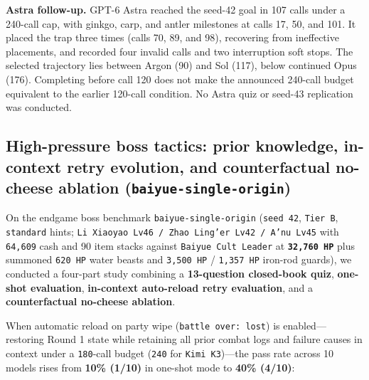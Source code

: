 \documentclass[11pt,a4paper]{article}
\begin{document}
\textbf{Astra follow-up.} GPT-6 Astra reached the seed-42 goal in 107 calls under a 240-call cap, with ginkgo, carp, and antler milestones at calls 17, 50, and 101. It placed the trap three times (calls 70, 89, and 98), recovering from ineffective placements, and recorded four invalid calls and two interruption soft stops. The selected trajectory lies between Argon (90) and Sol (117), below continued Opus (176). Completing before call 120 does not make the announced 240-call budget equivalent to the earlier 120-call condition. No Astra quiz or seed-43 replication was conducted.

\subsection{\texorpdfstring{High-pressure boss tactics: prior knowledge, in-context retry evolution, and counterfactual no-cheese ablation (\texttt{baiyue\allowbreak{}-\allowbreak{}single\allowbreak{}-\allowbreak{}origin})}{High-pressure boss tactics: prior knowledge, in-context retry evolution, and counterfactual no-cheese ablation (baiyue-single-origin)}}

On the endgame boss benchmark \texttt{baiyue\allowbreak{}-\allowbreak{}single\allowbreak{}-\allowbreak{}origin} (\texttt{seed\allowbreak{} \allowbreak{}42}, \texttt{Tier\allowbreak{} \allowbreak{}B}, \texttt{standard} hints; \texttt{Li\allowbreak{} \allowbreak{}Xiaoyao\allowbreak{} \allowbreak{}Lv46\allowbreak{} \allowbreak{}/\allowbreak{} \allowbreak{}Zhao\allowbreak{} \allowbreak{}Ling'er\allowbreak{} \allowbreak{}Lv42\allowbreak{} \allowbreak{}/\allowbreak{} \allowbreak{}A'nu\allowbreak{} \allowbreak{}Lv45} with \texttt{64\allowbreak{},\allowbreak{}609} cash and 90 item stacks against \texttt{Baiyue\allowbreak{} \allowbreak{}Cult\allowbreak{} \allowbreak{}Leader} at \textbf{\texttt{32\allowbreak{},\allowbreak{}760\allowbreak{} \allowbreak{}HP}} plus summoned \texttt{620\allowbreak{} \allowbreak{}HP} water beasts and \texttt{3\allowbreak{},\allowbreak{}500\allowbreak{} \allowbreak{}HP} / \texttt{1\allowbreak{},\allowbreak{}357\allowbreak{} \allowbreak{}HP} iron-rod guards), we conducted a four-part study combining a \textbf{13-question closed-book quiz}, \textbf{one-shot evaluation}, \textbf{in-context auto-reload retry evaluation}, and a \textbf{counterfactual no-cheese ablation}.

When automatic reload on party wipe (\texttt{battle\allowbreak{} \allowbreak{}over\allowbreak{}:\allowbreak{} \allowbreak{}lost}) is enabled---restoring Round 1 state while retaining all prior combat logs and failure causes in context under a \texttt{180}-call budget (\texttt{240} for \texttt{Kimi\allowbreak{} \allowbreak{}K3})---the pass rate across 10 models rises from \textbf{10\% (1/10)} in one-shot mode to \textbf{40\% (4/10)}:
\end{document}
